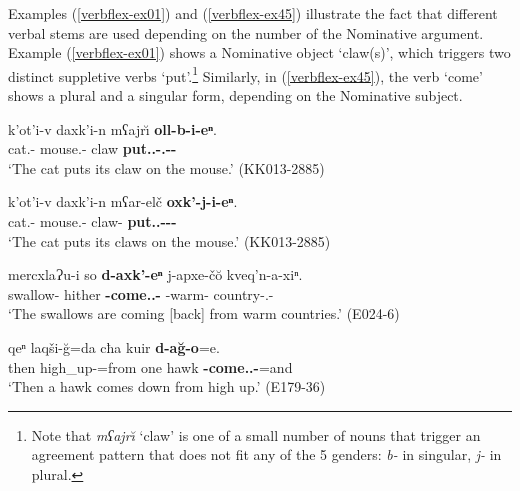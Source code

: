 Examples (\ref{verbflex-ex01}) and (\ref{verbflex-ex45}) illustrate the fact that different verbal stems are used depending on the number of the Nominative argument. Example (\ref{verbflex-ex01}) shows a Nominative object `claw(s)', which triggers two distinct suppletive verbs `put'.\footnote{Note that \textit{mʕajr\u{\i}} `claw' is one of a small number of nouns that trigger an agreement pattern that does not fit any of the 5 genders: \textit{b-} in singular, \textit{j-} in plural.} Similarly, in (\ref{verbflex-ex45}), the verb `come' shows a plural and a singular form, depending on the Nominative subject.

\begin{exe}
	\ex\label{verbflex-ex01}
	\begin{xlist}
		
		
			\ex\label{verbflex-ex01a}
			\gll k'ot'i-v daxk'i-n mʕajr\u{\i} \textbf{oll-b-i-eⁿ}. \\
			cat.{\Obl}-{\Erg} mouse.{\Obl}-{\Dat} claw \textbf{put.{\Pfv}.{\Sg}-{\B}.{\Sg}-{\Tr}-{\Aor}} \\
			\trans `The cat puts its claw on the mouse.'
			\hfill (KK013-2885)
		
		
		
			\ex\label{verbflex-ex01b}
			\gll k'ot'i-v daxk'i-n mʕar-elč \textbf{oxk'-j-i-eⁿ}.    \\
			cat.{\Obl}-{\Erg} mouse.{\Obl}-{\Dat} claw-{\Pl} \textbf{put.{\Pfv}.{\Pl}-{\J}-{\Tr}-{\Aor}} \\
			\trans `The cat puts its claws on the mouse.'
			\hfill (KK013-2885)
		
	\end{xlist}
\end{exe}

\begin{exe}
	\ex\label{verbflex-ex45}
	\begin{xlist}
		
		
			\ex\label{verbderiv-ex45a}
			\gll mercxlaɁu-i so \textbf{d-axk'-eⁿ} j-apxe-č\u{o} kveq'n-a-xiⁿ.  \\
			swallow-{\Pl} hither \textbf{{\D}-come.{\Pfv}.{\Pl}-{\Aor}} {\J}-warm-{\Obl} country-{\Obl}.{\Pl}-{\Apudabl} \\
			\trans `The swallows are coming [back] from warm countries.'
			\hfill (E024-6)
		
		
		
			\ex\label{verbflex-ex45b}
			\gll qeⁿ laqši-\u{g}=da cħa kuir \textbf{d-a\u{g}-o}=e.  \\
			then high\_up-{\Trans}=from one hawk \textbf{{\D}-come.{\Ipfv}.{\Sg}-{\Npst}}=and \\
			\trans `Then a hawk comes down from high up.'
			\hfill (E179-36)
		
	\end{xlist}
\end{exe}



